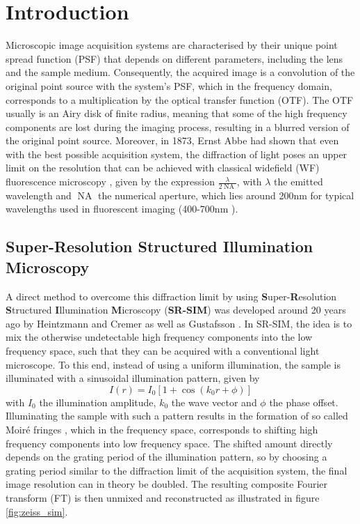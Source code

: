 \documentclass[conference]{IEEEtran}
\begin{document}
\section{Introduction}
Microscopic image acquisition systems are characterised by their unique point spread function (PSF) that depends on different parameters, including the lens and the sample medium. Consequently, the acquired image is a convolution of the original point source with the system's PSF, which in the frequency domain, corresponds to a multiplication by the optical transfer function (OTF). The OTF usually is an Airy disk \cite{airy1835diffraction} of finite radius, meaning that some of the high frequency components are lost during the imaging process, resulting in a blurred version of the original point source. Moreover, in 1873, Ernst Abbe had shown that even with the best possible acquisition system, the diffraction of light poses an upper limit on the resolution that can be achieved with classical widefield (WF) fluorescence microscopy \cite{Fluorescence_microscopy}, given by the expression $\frac{\lambda}{2\operatorname{NA}}$, with $\lambda$ the emitted wavelength and $\operatorname{NA}$ the numerical aperture, which lies around 200nm for typical wavelengths used in fluorescent imaging (400-700nm \cite{ZEISS_wavelengths}).

\subsection{Super-Resolution Structured Illumination Microscopy}

A direct method to overcome this diffraction limit by using \textbf{S}uper-\textbf{R}esolution \textbf{S}tructured \textbf{I}llumination \textbf{M}icroscopy (\textbf{SR-SIM}) was developed around 20 years ago by Heintzmann and Cremer \cite{Heintzmann_diffraction_grating} as well as Gustafsson \cite{Gustafsson_orig}. In SR-SIM, the idea is to mix the otherwise undetectable high frequency components into the low frequency space, such that they can be acquired with a conventional light microscope. To this end, instead of using a uniform illumination, the sample is illuminated with a sinusoidal illumination pattern, given by 
$$I(r)=I_0[1+\cos(k_0r+\phi)]$$
with $I_0$ the illumination amplitude, $k_0$ the wave vector and $\phi$ the phase offset. Illuminating the sample with such a pattern results in the formation of so called Moiré fringes \cite{moire_fringes_paper}, which in the frequency space, corresponds to shifting high frequency components into low frequency space. The shifted amount directly depends on the grating period of the illumination pattern, so by choosing a grating period similar to the diffraction limit of the acquisition system, the final image resolution can in theory be doubled. The resulting composite Fourier transform (FT) is then unmixed and reconstructed as illustrated in figure \ref{fig:zeiss_sim}.
\end{document}
